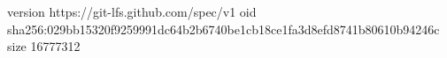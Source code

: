 version https://git-lfs.github.com/spec/v1
oid sha256:029bb15320f9259991dc64b2b6740be1cb18ce1fa3d8efd8741b80610b94246c
size 16777312
